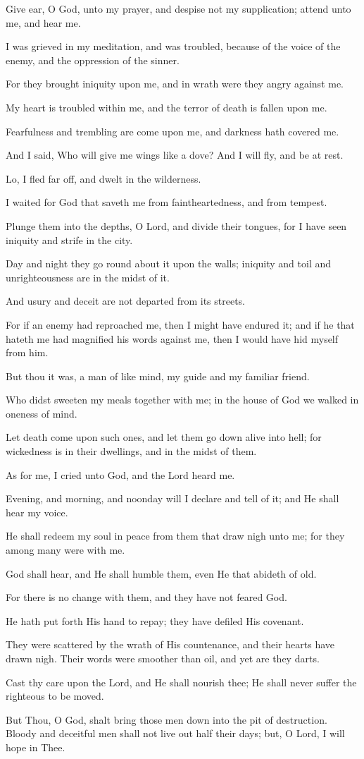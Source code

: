 Give ear, O God, unto my prayer, and despise not my supplication; attend unto me, and hear me.

I was grieved in my meditation, and was troubled, because of the voice of the enemy, and the oppression of the sinner.

For they brought iniquity upon me, and in wrath were they angry against me.

My heart is troubled within me, and the terror of death is fallen upon me.

Fearfulness and trembling are come upon me, and darkness hath covered me.

And I said, Who will give me wings like a dove? And I will fly, and be at rest.

Lo, I fled far off, and dwelt in the wilderness.

I waited for God that saveth me from faintheartedness, and from tempest.

Plunge them into the depths, O Lord, and divide their tongues, for I have seen iniquity and strife in the city.

Day and night they go round about it upon the walls; iniquity and toil and unrighteousness are in the midst of it.

And usury and deceit are not departed from its streets.

For if an enemy had reproached me, then I might have endured it; and if he that hateth me had magnified his words against me, then I would have hid myself from him.

But thou it was, a man of like mind, my guide and my familiar friend.

Who didst sweeten my meals together with me; in the house of God we walked in oneness of mind.

Let death come upon such ones, and let them go down alive into hell; for wickedness is in their dwellings, and in the midst of them.

As for me, I cried unto God, and the Lord heard me.

Evening, and morning, and noonday will I declare and tell of it; and He shall hear my voice.

He shall redeem my soul in peace from them that draw nigh unto me; for they among many were with me.

God shall hear, and He shall humble them, even He that abideth of old.

For there is no change with them, and they have not feared God.

He hath put forth His hand to repay; they have defiled His covenant.

They were scattered by the wrath of His countenance, and their hearts have drawn nigh. Their words were smoother than oil, and yet are they darts.

Cast thy care upon the Lord, and He shall nourish thee; He shall never suffer the righteous to be moved.

But Thou, O God, shalt bring those men down into the pit of destruction. Bloody and deceitful men shall not live out half their days; but, O Lord, I will hope in Thee.
